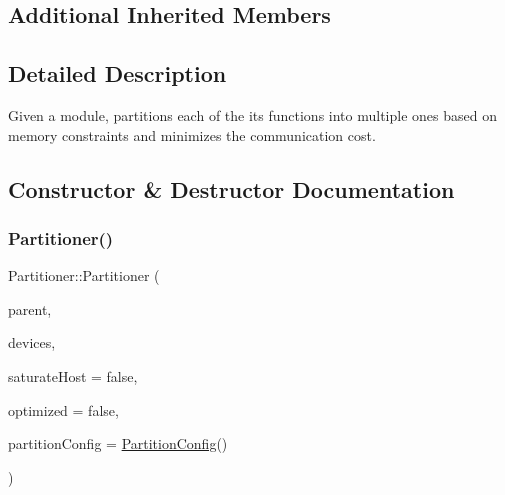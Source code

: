 \subsection*{Additional Inherited Members}


\subsection{Detailed Description}
Given a module, partitions each of the its functions into multiple ones based on memory constraints and minimizes the communication cost. 

\subsection{Constructor \& Destructor Documentation}
\mbox{\label{classglow_1_1_partitioner_a96c68cbdf64decc46911e4a4a67e432b}} 
\subsubsection{\texorpdfstring{Partitioner()}{Partitioner()}\hspace{0.1cm}{\footnotesize\ttfamily [1/2]}}
{\footnotesize\ttfamily Partitioner\+::\+Partitioner (\begin{DoxyParamCaption}\item[{\hyperlink{classglow_1_1_module}{Module} $\ast$}]{parent,  }\item[{const std\+::vector$<$ \hyperlink{structglow_1_1runtime_1_1_device_info}{Device\+Info} $>$ \&}]{devices,  }\item[{bool}]{saturate\+Host = {\ttfamily false},  }\item[{bool}]{optimized = {\ttfamily false},  }\item[{\hyperlink{structglow_1_1runtime_1_1_partition_config}{Partition\+Config}}]{partition\+Config = {\ttfamily \hyperlink{structglow_1_1runtime_1_1_partition_config}{Partition\+Config}()} }\end{DoxyParamCaption})}

